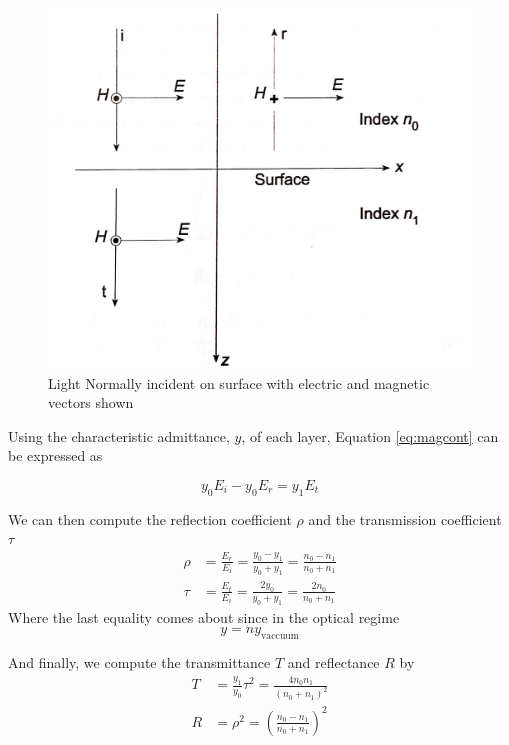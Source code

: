 \documentclass{article}
\begin{document}
    \begin{figure}
        \includegraphics[width=\linewidth]{simple_boundary_normal.png}
        \caption{Light Normally incident on surface with electric and magnetic vectors shown}
        \label{fig:norm}
    \end{figure}

    Using the characteristic admittance, $y$, of each layer, Equation \ref{eq:magcont} can be expressed as

    \begin{equation}
        y_0 E_i - y_0 E_r = y_1 E_t \label{eq:admit}
    \end{equation}

    We can then compute the reflection coefficient $\rho$ and the transmission coefficient $\tau$
    \begin{align}
        \rho &= \frac{E_r}{E_i} = \frac{y_0 - y_1}{y_0 + y_1} = \frac{n_0 - n_1}{n_0 + n_1} \\
        \tau &= \frac{E_t}{E_i} = \frac{2 y_0}{y_0 + y_1} = \frac{2 n_0}{n_0+n_1}
    \end{align}
    Where the last equality comes about since in the optical regime
    $$ y = n y_{\mathrm{vaccuum}} $$

    And finally, we compute the transmittance $T$ and reflectance $R$ by
    \begin{align}
        T &= \frac{y_1}{y_0}\tau^2 = \frac{4 n_0 n_1}{(n_0 + n_1)^2} \label{eq:trans} \\
        R &= \rho^2 = \left(\frac{n_0 - n_1}{n_0 + n_1}\right)^2 \label{eq:reflec}
    \end{align}
\end{document}

